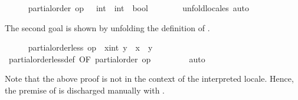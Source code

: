 \begin{isabellebody}
\isamarkuptrue%
\ \ \ \ \isamarkupfalse%
\ {}partial{}order\ {}op\ {}\ {}{}\ int\ {}\ int\ {}\ bool{}{}\isanewline
\ \ \ \ \ \ \isamarkupfalse%
\ unfold{}locales\ auto%
\begin{isamarkuptxt}%
\normalsize The second goal is shown by unfolding the
      definition of .%
\end{isamarkuptxt}%
\isamarkuptrue%
\ \ \ \ \isamarkupfalse%
\ {}partial{}order{}less\ op\ {}\ {}x{}{}int{}\ y\ {}\ {}x\ {}\ y{}{}\isanewline
\ \ \ \ \ \ \isamarkupfalse%
\ partial{}order{}less{}def\ {}OF\ {}partial{}order\ op\ {}{}{}\isanewline
\ \ \ \ \ \ \isamarkupfalse%
\ auto\isanewline
\ \ \isamarkupfalse%
%
\endisatagvisible
{\isafoldvisible}%
%
\isadelimvisible
%
\endisadelimvisible
%
\begin{isamarkuptext}%
Note that the above proof is not in the context of the
  interpreted locale.  Hence, the premise of  is discharged manually with .%
\end{isamarkuptext}%
\isamarkuptrue%
%
\isadelimtheory
%
\endisadelimtheory
%
\isatagtheory
{}\isamarkupfalse%
%
\endisatagtheory
{\isafoldtheory}%
%
\isadelimtheory
%
\endisadelimtheory
\isanewline
\end{isabellebody}%
